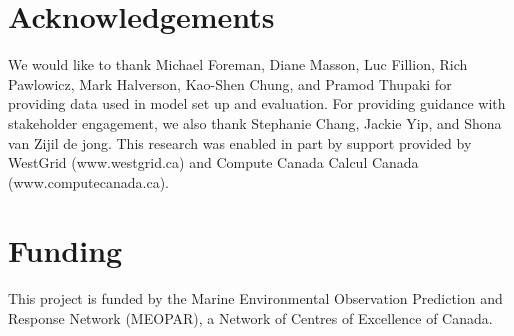 \documentclass[letterpaper]{tATO2e}
\begin{document}
\section*{Acknowledgements}\label{sec:ack}
We would like to thank Michael Foreman, Diane Masson, Luc Fillion, Rich Pawlowicz, Mark Halverson, Kao-Shen Chung, and Pramod Thupaki for providing data used in model set up and evaluation. For providing guidance with stakeholder engagement, we also thank Stephanie Chang, Jackie Yip, and Shona van Zijil de jong. This research was enabled in part by support provided by WestGrid (www.westgrid.ca) and Compute Canada Calcul Canada (www.computecanada.ca).

\section*{Funding}
This project is funded by the Marine Environmental Observation Prediction and Response Network (MEOPAR), a Network of Centres of Excellence of Canada.



\end{document}
